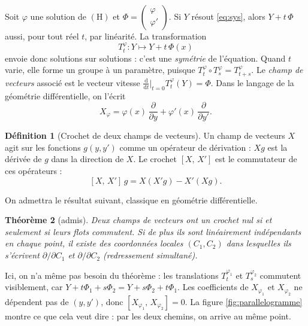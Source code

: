 \documentclass[11pt,a4paper]{article}
\theoremstyle{plain}
\newtheorem{theoreme}{Théorème}[section]
\theoremstyle{definition}
\newtheorem{definition}[theoreme]{Définition}
\theoremstyle{remark}
\newcommand{\cro}[2]{\left[#1,\,#2\right]}
\newcommand{\dd}{\mathrm{d}}
\begin{document}
Soit $\varphi$ une solution de $(\mathrm{H})$ et $\Phi = \begin{pmatrix} \varphi \\ \varphi' \end{pmatrix}$. Si $Y$ résout \eqref{eq:sys}, alors $Y + t\,\Phi$ aussi, pour tout réel $t$, par linéarité. La transformation
\[
  T_t^{\varphi} : Y \longmapsto Y + t\,\Phi(x)
\]
envoie donc solutions sur solutions : c'est une \emph{symétrie} de l'équation. Quand $t$ varie, elle forme un groupe à un paramètre, puisque $T_t^\varphi \circ T_s^\varphi = T_{t+s}^\varphi$. Le \emph{champ de vecteurs} associé est le vecteur vitesse $\frac{\dd}{\dd t}\big|_{t=0} T_t^\varphi(Y) = \Phi$. Dans le langage de la géométrie différentielle, on l'écrit
\[
  X_\varphi = \varphi(x)\,\frac{\partial}{\partial y} + \varphi'(x)\,\frac{\partial}{\partial y'} .
\]

\begin{definition}[Crochet de deux champs de vecteurs]
Un champ de vecteurs $X$ agit sur les fonctions $g(y,y')$ comme un opérateur de dérivation : $X g$ est la dérivée de $g$ dans la direction de $X$. Le crochet $\cro{X}{X'}$ est le commutateur de ces opérateurs :
\[
  \cro{X}{X'}\,g = X(X'g) - X'(Xg).
\]
\end{definition}

On admettra le résultat suivant, classique en géométrie différentielle.

\begin{theoreme}[admis]\label{thm:flots}
Deux champs de vecteurs ont un crochet nul si et seulement si leurs flots commutent. Si de plus ils sont linéairement indépendants en chaque point, il existe des coordonnées locales $(C_1, C_2)$ dans lesquelles ils s'écrivent $\partial/\partial C_1$ et $\partial/\partial C_2$ (redressement simultané).
\end{theoreme}

Ici, on n'a même pas besoin du théorème : les translations $T^{\varphi_1}_t$ et $T^{\varphi_2}_s$ commutent visiblement, car $Y + t\Phi_1 + s\Phi_2 = Y + s\Phi_2 + t\Phi_1$. Les coefficients de $X_{\varphi_1}$ et $X_{\varphi_2}$ ne dépendent pas de $(y,y')$, donc $\cro{X_{\varphi_1}}{X_{\varphi_2}} = 0$. La figure \ref{fig:parallelogramme} montre ce que cela veut dire : par les deux chemins, on arrive au même point.
\end{document}
